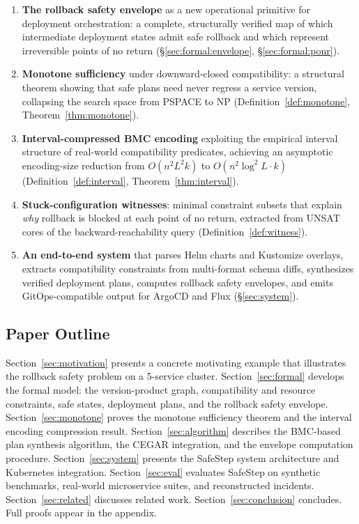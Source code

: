 \documentclass[10pt,twocolumn]{article}
\begin{document}
\begin{enumerate}
\item \textbf{The rollback safety envelope} as a new operational primitive
  for deployment orchestration: a complete, structurally verified map of
  which intermediate deployment states admit safe rollback and which
  represent irreversible points of no return
  (\S\ref{sec:formal:envelope}, \S\ref{sec:formal:ponr}).

\item \textbf{Monotone sufficiency} under downward-closed compatibility:
  a structural theorem showing that safe plans need never regress a service
  version, collapsing the search space from PSPACE to NP
  (Definition~\ref{def:monotone}, Theorem~\ref{thm:monotone}).

\item \textbf{Interval-compressed BMC encoding} exploiting the empirical
  interval structure of real-world compatibility predicates, achieving an
  asymptotic encoding-size reduction from $O(n^2 L^2 k)$ to
  $O(n^2 \log^2 L \cdot k)$ (Definition~\ref{def:interval},
  Theorem~\ref{thm:interval}).

\item \textbf{Stuck-configuration witnesses}: minimal constraint subsets
  that explain \emph{why} rollback is blocked at each point of no return,
  extracted from UNSAT cores of the backward-reachability query
  (Definition~\ref{def:witness}).

\item \textbf{An end-to-end system} that parses Helm charts and Kustomize
  overlays, extracts compatibility constraints from multi-format schema
  diffs, synthesizes verified deployment plans, computes rollback safety
  envelopes, and emits GitOps-compatible output for ArgoCD and Flux
  (\S\ref{sec:system}).
\end{enumerate}

\subsection{Paper Outline}
\label{sec:intro:outline}

Section~\ref{sec:motivation} presents a concrete motivating example that
illustrates the rollback safety problem on a 5-service cluster.
Section~\ref{sec:formal} develops the formal model: the version-product
graph, compatibility and resource constraints, safe states, deployment
plans, and the rollback safety envelope.
Section~\ref{sec:monotone} proves the monotone sufficiency theorem and the
interval encoding compression result.
Section~\ref{sec:algorithm} describes the BMC-based plan synthesis
algorithm, the CEGAR integration, and the envelope computation procedure.
Section~\ref{sec:system} presents the SafeStep system architecture and
Kubernetes integration.
Section~\ref{sec:eval} evaluates SafeStep on synthetic benchmarks,
real-world microservice suites, and reconstructed incidents.
Section~\ref{sec:related} discusses related work.
Section~\ref{sec:conclusion} concludes.
Full proofs appear in the appendix.
\end{document}
